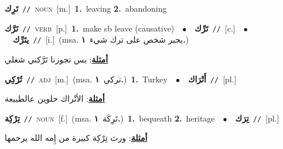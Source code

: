 \documentclass[10pt,a4paper,twoside]{article} %
\begin{document}
\begin{multicols}{2}
{\setlength\topsep{0pt}\textbf{\foreignlanguage{arabic}{تَرِك}}\ {\color{gray}\texttt{//}\color{black}}\ \textsc{noun}\ [m.]\ \textbf{1.}~leaving  \textbf{2.}~abandoning\ } \vspace{2mm}

{\setlength\topsep{0pt}\textbf{\foreignlanguage{arabic}{تَرَّك}}\ {\color{gray}\texttt{//}\color{black}}\ \textsc{verb}\ [p.]\ \textbf{1.}~make sb leave (causative)\ \ $\bullet$\ \ \setlength\topsep{0pt}\textbf{\foreignlanguage{arabic}{تَرِّك}}\ {\color{gray}\texttt{//}\color{black}}\ [c.]\ \ $\bullet$\ \ \setlength\topsep{0pt}\textbf{\foreignlanguage{arabic}{يتَرِّك}}\ {\color{gray}\texttt{//}\color{black}}\ [i.]\ \color{gray}(msa. \foreignlanguage{arabic}{يجبر شخص على ترك شيء}~\foreignlanguage{arabic}{\textbf{١.}})\color{black}\  \begin{flushright}\color{gray}\foreignlanguage{arabic}{\textbf{\underline{\foreignlanguage{arabic}{أمثلة}}}: بس تجوزنا تَرَّكني شغلي}\end{flushright}\color{black}} \vspace{2mm}

{\setlength\topsep{0pt}\textbf{\foreignlanguage{arabic}{تُرْكِي}}\ {\color{gray}\texttt{//}\color{black}}\ \textsc{adj}\ [m.]\ \color{gray}(msa. \foreignlanguage{arabic}{تركي}~\foreignlanguage{arabic}{\textbf{١.}})\color{black}\ \textbf{1.}~Turkey\ \ $\bullet$\ \ \setlength\topsep{0pt}\textbf{\foreignlanguage{arabic}{أَتْرَاك}}\ {\color{gray}\texttt{//}\color{black}}\ [pl.]\  \begin{flushright}\color{gray}\foreignlanguage{arabic}{\textbf{\underline{\foreignlanguage{arabic}{أمثلة}}}: الأتْراك حلوين عالطبيعة}\end{flushright}\color{black}} \vspace{2mm}

{\setlength\topsep{0pt}\textbf{\foreignlanguage{arabic}{تِرْكِة}}\ {\color{gray}\texttt{//}\color{black}}\ \textsc{noun}\ [f.]\ \color{gray}(msa. \foreignlanguage{arabic}{تَرِكَة}~\foreignlanguage{arabic}{\textbf{١.}})\color{black}\ \textbf{1.}~bequeath  \textbf{2.}~heritage\ \ $\bullet$\ \ \setlength\topsep{0pt}\textbf{\foreignlanguage{arabic}{تِرَك}}\ {\color{gray}\texttt{//}\color{black}}\ [pl.]\  \begin{flushright}\color{gray}\foreignlanguage{arabic}{\textbf{\underline{\foreignlanguage{arabic}{أمثلة}}}: ورث تِرْكِة كبيرة من إِمه الله يرحمها}\end{flushright}\color{black}} \vspace{2mm}


\end{multicols}
\end{document}
